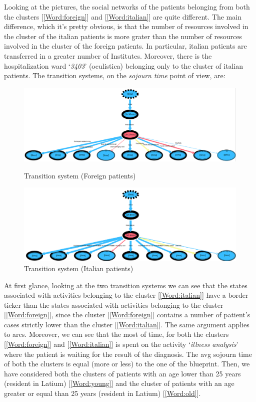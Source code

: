 \newline
\noindent
Looking at the pictures, the social networks of the patients belonging from both the clusters [\ref{Word:foreign}] and [\ref{Word:italian}] are quite different. The main difference, which it’s pretty obvious, is that the number of resources involved in the cluster of the italian patients is more grater than the number of resources involved in the cluster of the foreign patients. In particular, italian patients are transferred in a greater number of Institutes. Moreover, there is the hospitalization ward `\textit{3403}' (oculistica) belonging only to the cluster of italian patients. The transition systems, on the \textit{sojourn time} point of view, are:
\begin{figure} [h]
\includegraphics[width=\textwidth]{ProntoSoccorsoSojournForeigns}
\caption{Transition system (Foreign patients)}
\includegraphics[width=\textwidth]{ProntoSoccorsoSojournItalians}
\caption{Transition system (Italian patients)}
\end{figure} \newline
At first glance, looking at the two transition systems we can see that the states associated with activities belonging to the cluster [\ref{Word:italian}] have a border ticker than the states associated with activities belonging to the cluster [\ref{Word:foreign}], since the cluster [\ref{Word:foreign}] contains a number of patient's cases strictly lower than the cluster [\ref{Word:italian}]. The same argument applies to arcs. Moreover, we can see that the most of time, for both the clusters [\ref{Word:foreign}] and [\ref{Word:italian}] is spent on the activity `\textit{illness analysis}' where the patient is waiting for the result of the diagnosis. The avg sojourn time of both the clusters is equal (more or less) to the one of the blueprint. Then, we have considered both the clusters of patients with an age lower than 25 years (resident in Latium) [\ref{Word:young}] and the cluster of patients with an age greater or equal than 25 years (resident in Latium) [\ref{Word:old}]. 
